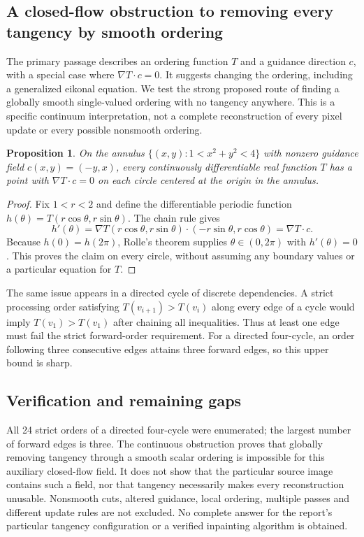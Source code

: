 \documentclass[11pt]{article}
\newtheorem{proposition}{Proposition}
\begin{document}
\subsection{A closed-flow obstruction to removing every tangency by smooth ordering}
The primary passage describes an ordering function $T$ and a guidance direction $c$, with a special case where $\nabla T\cdot c=0$. It suggests changing the ordering, including a generalized eikonal equation. We test the strong proposed route of finding a globally smooth single-valued ordering with no tangency anywhere. This is a specific continuum interpretation, not a complete reconstruction of every pixel update or every possible nonsmooth ordering.
\begin{proposition}
On the annulus $\{(x,y):1<x^2+y^2<4\}$ with nonzero guidance field $c(x,y)=(-y,x)$, every continuously differentiable real function $T$ has a point with $\nabla T\cdot c=0$ on each circle centered at the origin in the annulus.
\end{proposition}
\begin{proof}
Fix $1<r<2$ and define the differentiable periodic function $h(\theta)=T(r\cos\theta,r\sin\theta)$. The chain rule gives
\[
h'(\theta)=\nabla T(r\cos\theta,r\sin\theta)\cdot(-r\sin\theta,r\cos\theta)=\nabla T\cdot c.
\]
Because $h(0)=h(2\pi)$, Rolle's theorem supplies $\theta\in(0,2\pi)$ with $h'(\theta)=0$. This proves the claim on every circle, without assuming any boundary values or a particular equation for $T$.
\end{proof}
The same issue appears in a directed cycle of discrete dependencies. A strict processing order satisfying $T(v_{i+1})>T(v_i)$ along every edge of a cycle would imply $T(v_1)>T(v_1)$ after chaining all inequalities. Thus at least one edge must fail the strict forward-order requirement. For a directed four-cycle, an order following three consecutive edges attains three forward edges, so this upper bound is sharp.
\subsection{Verification and remaining gaps}
All 24 strict orders of a directed four-cycle were enumerated; the largest number of forward edges is three. The continuous obstruction proves that globally removing tangency through a smooth scalar ordering is impossible for this auxiliary closed-flow field. It does not show that the particular source image contains such a field, nor that tangency necessarily makes every reconstruction unusable. Nonsmooth cuts, altered guidance, local ordering, multiple passes and different update rules are not excluded. No complete answer for the report's particular tangency configuration or a verified inpainting algorithm is obtained.
\end{document}
